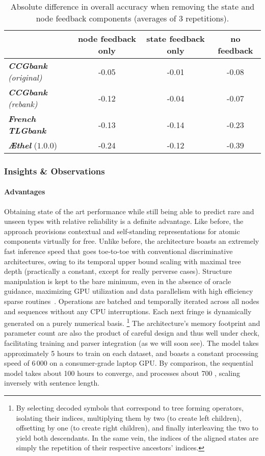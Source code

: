 \begin{table}
    \centering
    {\small
    \begin{tabular}{@{}l@{\qquad}ccc@{}}
        &  {node feedback only}  & {state feedback only} & {no feedback} \\
        \toprule
        \textit{\textbf{CCGbank} (original)} & -0.05 & -0.01 & -0.08 \\ 
        \textit{\textbf{CCGbank} (rebank)} & -0.12 & -0.04 & -0.07 \\
        \textit{\textbf{French TLGbank}} & -0.13 & -0.14 & -0.23 \\
        \textit{\textbf{\AE thel}} ($\mathtt{1.0.0}$) & -0.24 & -0.12 & -0.39
    \end{tabular}}
    \caption{Absolute difference in overall accuracy when removing the state and node feedback components (averages of 3 repetitions).}
    \label{table:ablations}
\end{table}


\subsubsection{Insights \& Observations}
\paragraph{Advantages}
Obtaining state of the art performance while still being able to predict rare and unseen types with relative reliability is a definite advantage.
Like before, the approach provisions contextual and self-standing representations for atomic components virtually for free.
Unlike before, the architecture boasts an extremely fast inference speed that goes toe-to-toe with conventional discriminative architectures, owing to its temporal upper bound scaling with maximal tree depth (practically a constant, except for really perverse cases).
Structure manipulation is kept to the bare minimum, even in the absence of oracle guidance, maximizing GPU utilization and data parallelism with high efficiency sparse routines~\cite{fey2019fast}.
Operations are batched and temporally iterated across all nodes and sequences without any CPU interruptions.
Each next fringe is dynamically generated on a purely numerical basis.%
	\footnote{By selecting decoded symbols that correspond to tree forming operators, isolating their indices, multiplying them by two (to create left children), offsetting by one (to create right children), and finally interleaving the two to yield both descendants.
In the same vein, the indices of the aligned states are simply the repetition of their respective ancestors' indices.}
The architecture's memory footprint and parameter count are also the product of careful design and thus well under check, facilitating training and parser integration (as we will soon see).
The model takes approximately 5 hours to train on each dataset, and boasts a constant processing speed of 6\,000  on a consumer-grade laptop GPU. By comparison, the sequential model takes about 100 hours to converge, and processes about 700 , scaling inversely with sentence length.

